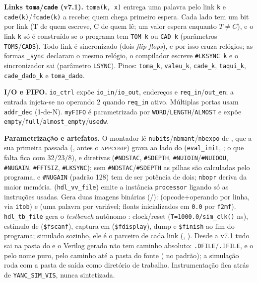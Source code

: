 \documentclass[11pt,a4paper,oneside]{article}
\newcommand{\file}[1]{\path{#1}}
\newcommand{\tool}[1]{\textsc{#1}}
\begin{document}
\textbf{Links \texttt{toma}/\texttt{cade} (v7.1).} \lstinline|toma(k, x)| entrega uma palavra pelo link \lstinline|k| e \lstinline|cade(k)|/\lstinline|fcade(k)| a recebe; quem chega primeiro espera. Cada lado tem um bit por link (T de quem escreve, C de quem lê; um valor espera enquanto $T \neq C$), e o link \lstinline|k| só é construído se o programa tem \lstinline|TOM k| ou \lstinline|CAD k| (parâmetros \lstinline|TOMS|/\lstinline|CADS|). Todo link é sincronizado (dois \emph{flip-flops}), e por isso cruza relógios; as formas \lstinline|_sync| declaram o mesmo relógio, o compilador escreve \lstinline|#LKSYNC k| e o sincronizador sai (parâmetro \lstinline|LSYNC|). Pinos: \lstinline|toma_k|, \lstinline|valeu_k|, \lstinline|cade_k|, \lstinline|taqui_k|, \lstinline|cade_dado_k| e \lstinline|toma_dado|.

\textbf{I/O e FIFO.} \lstinline|io_ctrl| expõe \lstinline|io_in|/\lstinline|io_out|, endereços e \lstinline|req_in|/\lstinline|out_en|; a entrada injeta-se no operando 2 quando \lstinline|req_in| ativo. Múltiplas portas usam \lstinline|addr_dec| (1-de-N). \lstinline|myFIFO| é parametrizada por \lstinline|WORD|/\lstinline|LENGTH|/\lstinline|ALMOST| e expõe \lstinline|empty|/\lstinline|full|/\lstinline|almost_empty|/\lstinline|usedw|.

\textbf{Parametrização e artefatos.} O montador lê \lstinline|nubits|/\lstinline|nbmant|/\lstinline|nbexpo| de , que a sua primeira passada (\file{pass1.c}, antes o \tool{appcomp}) grava ao lado do  (\lstinline|eval_init|, \file{eval.c}; o que falta fica com 32/23/8), e diretivas (\lstinline|#NDSTAC|, \lstinline|#SDEPTH|, \lstinline|#NUIOIN|/\lstinline|#NUIOOU|, \lstinline|#NUGAIN|, \lstinline|#FFTSIZ|, \lstinline|#LKSYNC|); sem \lstinline|#NDSTAC|/\lstinline|#SDEPTH| as pilhas são calculadas pelo programa, e \lstinline|#NUGAIN| (padrão 128) tem de ser potência de dois; \lstinline|nbopr| deriva da maior memória. \file{hdl.c} (\lstinline|hdl_vv_file|) emite a instância \lstinline|processor| ligando só as instruções usadas. Gera duas imagens binárias (\file{hdl.c}/\file{eval.c}):  (opcode+operando por linha, via \lstinline|itob|) e  (uma palavra por variável; floats inicializados em \lstinline|0.0| por \lstinline|f2mf|). \lstinline|hdl_tb_file| gera o \emph{testbench} autônomo : clock/reset (\lstinline|T=1000.0/sim_clk()| ns), estímulo de  (\lstinline|$fscanf|), captura em  (\lstinline|$fdisplay|), dump  e \lstinline|$finish| ao fim do programa; simulado sozinho, ele é o parceiro de cada link (, ). Desde a v7.1 tudo sai na pasta do  e o Verilog gerado não tem caminho absoluto: \lstinline|.DFILE|/\lstinline|.IFILE|,  e o  pelo nome puro,  pelo caminho até a pasta do fonte ( no padrão); a simulação roda com a pasta de saída como diretório de trabalho. Instrumentação fica atrás de \lstinline|YANC_SIM_VIS|, nunca sintetizada.
\end{document}
